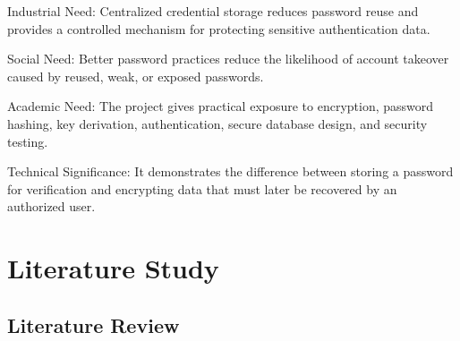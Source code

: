 \documentclass[12pt,a4paper,oneside]{report}
\begin{document}
Industrial Need: Centralized credential storage reduces password reuse and provides a controlled mechanism for protecting sensitive authentication data.

Social Need: Better password practices reduce the likelihood of account takeover caused by reused, weak, or exposed passwords.

Academic Need: The project gives practical exposure to encryption, password hashing, key derivation, authentication, secure database design, and security testing.

Technical Significance: It demonstrates the difference between storing a password for verification and encrypting data that must later be recovered by an authorized user.


\chapter{Literature Study}

\section{Literature Review}
\end{document}
